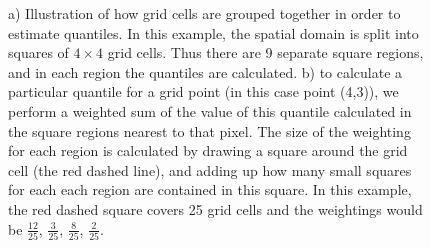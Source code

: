 \documentclass{article}
\begin{document}
\begin{figure}[h]
      \caption{a) Illustration of how grid cells are grouped together in order to estimate quantiles. In this example, the spatial domain is split into squares of $4 \times 4$ grid cells. Thus there are 9 separate square regions, and in each region the quantiles are calculated. b) to calculate a particular quantile for a grid point (in this case point (4,3)), we perform a weighted sum of the value of this quantile calculated in the square regions nearest to that pixel. The size of the weighting for each region is calculated by drawing a square around the grid cell (the red dashed line), and adding up how many small squares for each each region are contained in this square. In this example, the red dashed square covers 25 grid cells and the weightings would be $\frac{12}{25}$, $\frac{3}{25}$, $\frac{8}{25}$, $\frac{2}{25}$.}
     \label{fig:quantiles}
\end{figure}    
\end{document}
